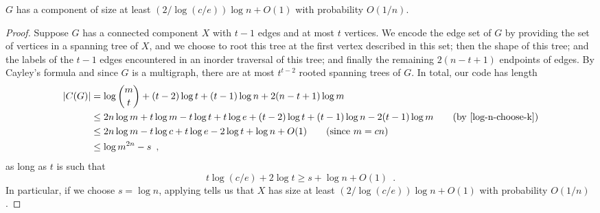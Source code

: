 \documentclass{patmorin}
\begin{document}
\begin{lem}
  $G$ has a component of size at least $(2/\log(c/e))\log n + O(1)$
  with probability $O(1/n)$.
\end{lem}
\begin{proof}
  Suppose $G$ has a connected component $X$ with $t - 1$ edges and at
  most $t$ vertices. We encode the edge set of $G$ by providing the
  set of vertices in a spanning tree of $X$, and we choose to root
  this tree at the first vertex described in this set; then the shape
  of this tree; and the labels of the $t - 1$ edges encountered in an
  inorder traversal of this tree; and finally the remaining
  $2(n - t + 1)$ endpoints of edges. By Cayley's formula and since $G$
  is a multigraph, there are at most $t^{t - 2}$ rooted spanning trees
  of $G$. In total, our code has length
  \begin{align*}
    |C(G)| &= \log \binom{m}{t} + (t - 2) \log t + (t - 1) \log n + 2 (n - t + 1) \log m \\
           &\le 2n \log m + t\log m - t\log t + t\log e + (t-2)\log t + (t-1)\log n - 2(t-1)\log m \tag{by \eqref{log-n-choose-k}} \\
           &\le 2n \log m - t\log c + t\log e - 2\log t + \log n + O(1) \tag{since $m = cn$} \\
           &\le \log m^{2n} - s \enspace ,
  \end{align*}
  as long as $t$ is such that
  \[t \log (c/e) + 2\log t \geq s + \log n + O(1) \enspace .\]
  In particular, if we choose $s = \log n$, applying 
  tells us that $X$ has size at least $(2/\log (c/e))\log n + O(1)$
  with probability $O(1/n)$.
\end{proof}
\end{document}
